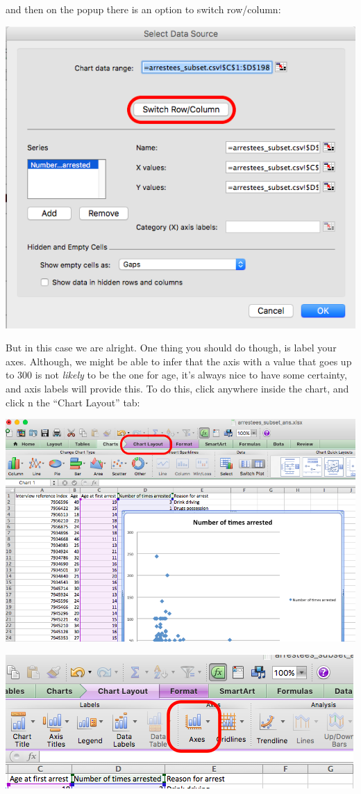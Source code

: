 \documentclass[]{book}
\theoremstyle{definition}
\theoremstyle{definition}
\theoremstyle{definition}
\theoremstyle{remark}
\begin{document}
and then on the popup there is an option to switch row/column:

\includegraphics{imgs/scatter_5.png}

But in this case we are alright. One thing you should do though, is
label your axes. Although, we might be able to infer that the axis with
a value that goes up to 300 is not \emph{likely} to be the one for age,
it's always nice to have some certainty, and axis labels will provide
this. To do this, click anywhere inside the chart, and click n the
``Chart Layout'' tab:

\includegraphics{imgs/scatter_6.png}

\includegraphics{imgs/scatter_7.png}
\end{document}
